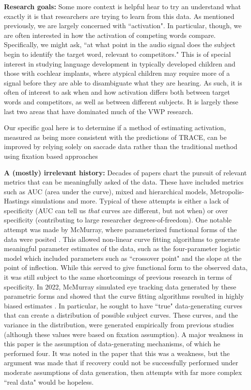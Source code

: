 \documentclass{article}
\begin{document}
\textbf{Research goals: } Some more context is helpful hear to try an understand what exactly it is that researchers are trying to learn from this data. As mentioned previously, we are largely concerned with ``activation". In particular, though, we are often interested in how the activation of competing words compare. Specifically, we might ask, ``at what point in the audio signal does the subject begin to identify the target word, relevant to competitors." This is of special interest in studying language development in typically developed children and those with cochlear implants, where atypical children may require more of a signal before they are able to disambiguate what they are hearing. As such, it is often of interest to ask when and how activation differs both between target words and competitors, as well as between different subjects. It is largely these last two areas that have dominated much of the VWP research.

Our specific goal here is to determine if a method of estimating activation, measured as being more consistent with the predictions of TRACE, can be improved by relying solely on saccade data rather than the traditional method using fixation based approaches


\textbf{A (mostly) irrelevant history: } Decades of papers chart the pursuit of relevant metrics that can be meaningfully asked of the data. These have included metrics such as AUC (area under the curve), mixed and hierarchical models, Metropolis-Hastings simulations and more. Typical of these attempts is either a lack of specificity (AUC can tell us \textit{that} curves are different, but not when) or over specificity (contributing to large researcher degrees-of-freedom). One notable attempt was made by McMurray, where parameterized functional forms of the data were posited \cite{mcmurray2010individual}. This allowed non-linear curve fitting algorithms to generate meaningful parameter estimates of the data, such as the four-parameter logistic model which included parameters such as ``crossover point"
 and the slope at the point of inflection. While this served to give functional form to the observed data, it was still subject to the same shortcomings of previous research in terms of specificity. 
In 2022, McMurray simulated eye tracking data generated by these parametric forms and showed that the curve fitting algorithms resulted in highly biased estimates \cite{mcmurray2022m}. In particular, he sought to have ``true" data-generating curves that can create a distribution of possible subject curves. These curves, and the variance in the distribution, were generated empirically from previous studies (although these values were based on fixation assumption). A major weakness in this paper is the assumption of data-generating mechanisms, of which he performed four. It was noted in the paper that this was a weakness, but the argument was made that if recovery could not be successfully performed under moderate assumptions of data generation, then attempts with far more complex ``real data" would be hopeless. 
\end{document}
